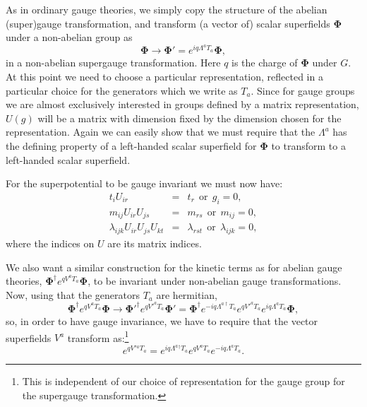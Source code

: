 \documentclass[notes.tex]{subfiles}
\begin{document}
As in ordinary gauge theories, we simply copy the structure of the abelian (super)gauge transformation, and transform (a vector of) scalar superfields $\boldsymbol\Phi$ under a non-abelian group as
\[\boldsymbol\Phi \to \boldsymbol\Phi'=e^{iq \Lambda^aT_a}\boldsymbol\Phi,\]
in a non-abelian supergauge transformation. Here $q$ is the charge of $\boldsymbol\Phi$ under $G$. At this point we need to choose a particular representation, reflected in a particular choice for the generators which we write as $T_a$. Since for gauge groups we are almost exclusively interested in groups defined by a matrix representation, $U(g)$ will be a matrix with dimension fixed by the dimension chosen for the representation. Again we can easily show that we must require that the $\Lambda^a$ has the defining property of a left-handed scalar superfield for $\boldsymbol\Phi$ to transform to a left-handed scalar superfield.

For the superpotential to be gauge invariant we must now have:
\begin{eqnarray}
t_iU_{ir} &=& t_r ~~\text{or}~~ g_i = 0, \\
m_{ij}U_{ir} U_{js} &=& m_{rs} ~~\text{or}~~m_{ij}=0, \\
 \lambda_{ijk}U_{ir} U_{js}U_{kt}&=& \lambda_{rst} ~~\text{or}~~\lambda_{ijk}=0,
\end{eqnarray}
where the indices on $U$ are its matrix indices. 

We also want a similar construction for the kinetic terms as for abelian gauge theories, $\boldsymbol\Phi^\dagger e^{qV^aT_a}\boldsymbol\Phi$, to be invariant under non-abelian gauge transformations. Now, using that the generators $T_a$ are hermitian, 
\[\boldsymbol\Phi^\dagger e^{qV^aT_a}\boldsymbol\Phi \to \boldsymbol\Phi'^\dagger e^{qV'^aT_a}\boldsymbol\Phi' = \boldsymbol\Phi^\dagger e^{-iq\Lambda^{a\dagger} T_a} e^{qV'^aT_a}e^{iq\Lambda^aT_a}\boldsymbol\Phi,\]
so, in order to have gauge invariance, we have to require that the vector superfields $V^a$ transform as:\footnote{This is independent of our choice of representation for the gauge group for the supergauge transformation.}
\begin{equation}
e^{qV'{}^aT_a} = e^{iq\Lambda^a{}^\dagger T_a}e^{qV^aT_a} e^{-iq\Lambda^a T_a}.
\end{equation}
\end{document}
